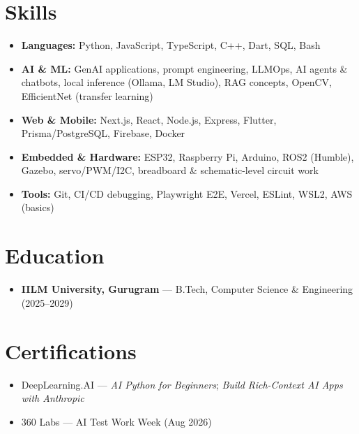 \documentclass[10pt]{article}
\newif\ifresearch \researchfalse
\newcommand{\itemhead}[1]{\textbf{#1}}
\begin{document}
\section{Skills}
\begin{itemize}
\ifresearch
  \item \itemhead{Research \& Evaluation:} agent evaluation \& benchmarking, model trajectory debugging, E2E test automation (Playwright), local LLM inference (Ollama, LM Studio), RAG, prompt/context design
\fi
  \item \itemhead{Languages:} Python, JavaScript, TypeScript, C++, Dart, SQL, Bash
  \item \itemhead{AI \& ML:} GenAI applications, prompt engineering, LLMOps, AI agents \& chatbots, local inference (Ollama, LM Studio), RAG concepts, OpenCV, EfficientNet (transfer learning)
  \item \itemhead{Web \& Mobile:} Next.js, React, Node.js, Express, Flutter, Prisma/PostgreSQL, Firebase, Docker
  \item \itemhead{Embedded \& Hardware:} ESP32, Raspberry Pi, Arduino, ROS2 (Humble), Gazebo, servo/PWM/I2C, breadboard \& schematic-level circuit work
  \item \itemhead{Tools:} Git, CI/CD debugging, Playwright E2E, Vercel, ESLint, WSL2, AWS (basics)
\end{itemize}

\section{Education}
\begin{itemize}
  \item \itemhead{IILM University, Gurugram} --- B.Tech, Computer Science \& Engineering (2025--2029)
\end{itemize}

\section{Certifications}
\begin{itemize}
  \item DeepLearning.AI --- \textit{AI Python for Beginners}; \textit{Build Rich-Context AI Apps with Anthropic}
  \item 360 Labs --- AI Test Work Week (Aug 2026)
\end{itemize}
\end{document}

